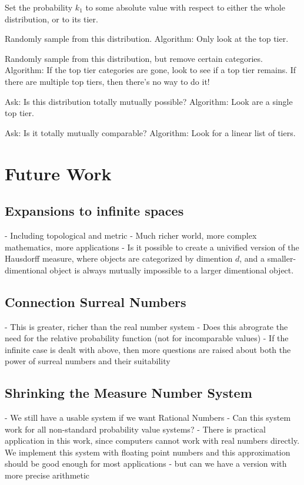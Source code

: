 \documentclass[twoside]{article}
\begin{document}
Set the probability \(k_1\) to some absolute value with respect to either the whole distribution, or to its tier.

Randomly sample from this distribution. Algorithm: Only look at the top tier.

Randomly sample from this distribution, but remove certain categories. Algorithm: If the top tier categories are gone, look to see if a top tier remains. If there are multiple top tiers, then there's no way to do it!

Ask: Is this distribution totally mutually possible? Algorithm: Look are a single top tier.

Ask: Is it totally mutually comparable? Algorithm: Look for a linear list of tiers.

\section{Future Work}
\subsection{Expansions to infinite spaces}
- Including topological and metric
- Much richer world, more complex mathematics, more applications
- Is it possible to create a univified version of the Hausdorff measure, where objects are categorized by dimention \(d\), and a smaller-dimentional object is always mutually impossible to a larger dimentional object.
\subsection{Connection Surreal Numbers}
- This is greater, richer than the real number system
- Does this abrograte the need for the relative probability function (not for incomparable values)
- If the infinite case is dealt with above, then more questions are raised about both the power of surreal numbers and their suitability
\subsection{Shrinking the Measure Number System}
- We still have a usable system if we want Rational Numbers
- Can this system work for all non-standard probability value systems?
- There is practical application in this work, since computers cannot work with real numbers directly. We implement this system with floating point numbers and this approximation should be good enough for most applications - but can we have a version with more precise arithmetic
\end{document}
